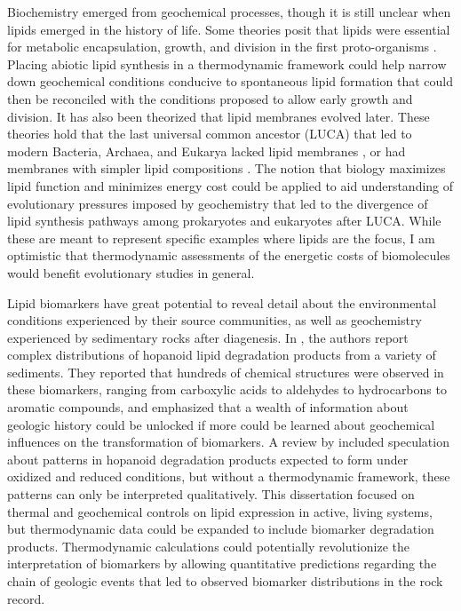 Biochemistry emerged from geochemical processes, though it is still unclear when lipids emerged in the history of life. Some theories posit that lipids were essential for metabolic encapsulation, growth, and division in the first proto-organisms \citep{deamer2002first, luisi2016emergence}. Placing abiotic lipid synthesis in a thermodynamic framework could help narrow down geochemical conditions conducive to spontaneous lipid formation that could then be reconciled with the conditions proposed to allow early growth and division. It has also been theorized that lipid membranes evolved later.  These theories hold that the last universal common ancestor (LUCA) that led to modern Bacteria, Archaea, and Eukarya lacked lipid membranes \citep{koga1998did, martin2003origins}, or had membranes with simpler lipid compositions \citep{sojo2014bioenergetic}. The notion that biology maximizes lipid function and minimizes energy cost could be applied to aid understanding of evolutionary pressures imposed by geochemistry that led to the divergence of lipid synthesis pathways among prokaryotes and eukaryotes after LUCA. While these are meant to represent specific examples where lipids are the focus, I am optimistic that thermodynamic assessments of the energetic costs of biomolecules would benefit evolutionary studies in general.


Lipid biomarkers have great potential to reveal detail about the environmental conditions experienced by their source communities, as well as geochemistry experienced by sedimentary rocks after diagenesis. In \cite{ourisson1979hopanoids}, the authors report complex distributions of hopanoid lipid degradation products from a variety of sediments. They reported that hundreds of chemical structures were observed in these biomarkers, ranging from carboxylic acids to aldehydes to hydrocarbons to aromatic compounds, and emphasized that a wealth of information about geologic history could be unlocked if more could be learned about geochemical influences on the transformation of biomarkers. A review by \cite{ourisson1992hopanoids} included speculation about patterns in hopanoid degradation products expected to form under oxidized and reduced conditions, but without a thermodynamic framework, these patterns can only be interpreted qualitatively. This dissertation focused on thermal and geochemical controls on lipid expression in active, living systems, but thermodynamic data could be expanded to include biomarker degradation products. Thermodynamic calculations could potentially revolutionize the interpretation of biomarkers by allowing quantitative predictions regarding the chain of geologic events that led to observed biomarker distributions in the rock record.

